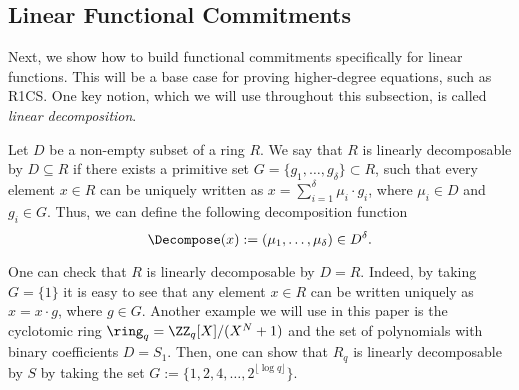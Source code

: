 	\subsection{Linear Functional Commitments}\label{subsec:linfunct-commit}
    Next, we show how to build functional commitments specifically for linear functions. This will be a base case for proving higher-degree equations, such as R1CS. One key notion, which we will use throughout this subsection, is called \textit{linear decomposition}.

    \begin{definition}
        Let $D$ be a non-empty subset of a ring $R$. We say that $R$ is linearly decomposable by $D \subseteq R$ if there exists a primitive set $G = \{g_1,\ldots,g_\delta\} \subset R$, such that every element $x \in R$ can be uniquely written as $x = \sum^{\delta}_{i = 1} \mu_i \cdot g_i$, where $\mu_i \in D$ and $g_i \in G$. Thus, we can define the following decomposition function
        \[ \Decompose(x) := (\mu_1,\ldots,\mu_\delta) \in D^\delta.\]
    \end{definition}
    \begin{example}
        One can check that $R$ is linearly decomposable by $D = R$. Indeed, by taking $G = \{1\}$ it is easy to see that any element $x \in R$ can be written uniquely as $x = x \cdot g$, where $g \in G$. Another example we will use in this paper is the cyclotomic ring $\ring_q = \ZZ_q[X]/(X^N+1)$ and the set of polynomials with binary coefficients $D = S_1$. Then, one can show that $R_q$ is linearly decomposable by $S$ by taking the set $G := \{1,2,4,\ldots,2^{\lfloor \log q \rfloor}\}$.
    \end{example}
    

